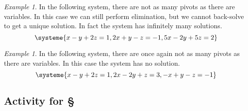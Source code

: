 \documentclass[11pt,oneside]{amsbook}
\theoremstyle{definition}
\theoremstyle{plain}
\theoremstyle{definition}
\theoremstyle{remark}
\newtheorem{example}[theorem]{Example}
\numberwithin{equation}{section}
\numberwithin{figure}{section}
\begin{document}
\begin{example}
  In the following system, there are not as many pivots as there are variables. In this case we can still perform elimination, but we cannot back-solve to get a unique solution. In fact the system has infinitely many solutions.
  \[\systeme{x-y+2z=1,2x+y-z=-1,5x-2y+5z=2}
  \]
\end{example}

\begin{example}
  In the following system, there are once again not as many pivots as there are variables. In this case the system has no solution.
  \[\systeme{x-y+2z=1,2x-2y+z=3,-x+y-z=-1}
  \]
\end{example}

\newpage
\subsection*{Activity for \S \thesection}
\end{document}
